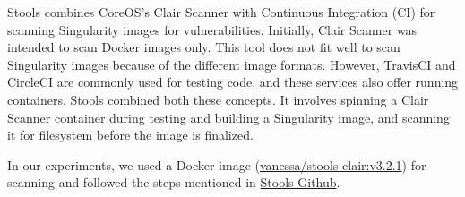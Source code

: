 \documentclass[a4paper,num-refs]{oup-contemporary}
\begin{document}
Stools combines CoreOS's Clair Scanner with Continuous Integration (CI)
for scanning Singularity images for vulnerabilities.
Initially, Clair Scanner was intended to scan Docker images only. This tool does not fit well
to scan Singularity images because of the different image formats.
However, TravisCI and CircleCI are commonly used for testing code, and these
services also offer running containers. Stools combined both these concepts.
It involves spinning a Clair Scanner container during testing and building a
Singularity image, and scanning it for filesystem before the image is finalized.

In our experiments, we used a Docker image (\href{https://hub.docker.com/r/vanessa/stools-clair}{vanessa/stools-clair:v3.2.1})
for scanning and followed the steps mentioned in \href{https://github.com/singularityhub/stools}{Stools Github}.

\end{document}
